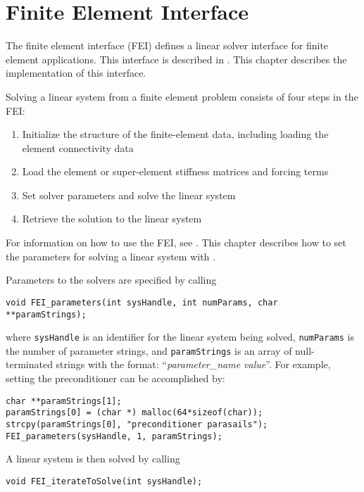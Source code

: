 \chapter{Finite Element Interface}
\label{chapter-FEI}

The finite element interface (FEI) defines a linear solver interface 
for finite element applications.  This interface is described in 
\cite{FEI-ref}.  This chapter describes the \hypre{} implementation
of this interface.

Solving a linear system from a finite element problem consists of
four steps in the FEI:
\begin{enumerate}
\item Initialize the structure of the finite-element data,
      including loading the element connectivity data
\item Load the element or super-element stiffness matrices and forcing terms
\item Set solver parameters and solve the linear system
\item Retrieve the solution to the linear system
\end{enumerate}

For information on how to use the FEI, see \cite{FEI-ref}.
This chapter describes how to set the parameters for solving a
linear system with \hypre{}.

Parameters to the \hypre{} solvers are specified by calling
\begin{display}
\begin{verbatim}
void FEI_parameters(int sysHandle, int numParams, char **paramStrings);
\end{verbatim}
\end{display}
where {\tt sysHandle} is an identifier for the linear system being solved,
{\tt numParams} is the number of parameter strings, and {\tt paramStrings} is
an array of null-terminated strings with the format: 
``{\em parameter\_name value}''.
For example, setting the preconditioner can be accomplished by:
\begin{display}
\begin{verbatim}
char **paramStrings[1];
paramStrings[0] = (char *) malloc(64*sizeof(char));
strcpy(paramStrings[0], "preconditioner parasails");
FEI_parameters(sysHandle, 1, paramStrings);
\end{verbatim}
\end{display}

A linear system is then solved by calling 
\begin{display}
\begin{verbatim}
void FEI_iterateToSolve(int sysHandle);
\end{verbatim}
\end{display}

